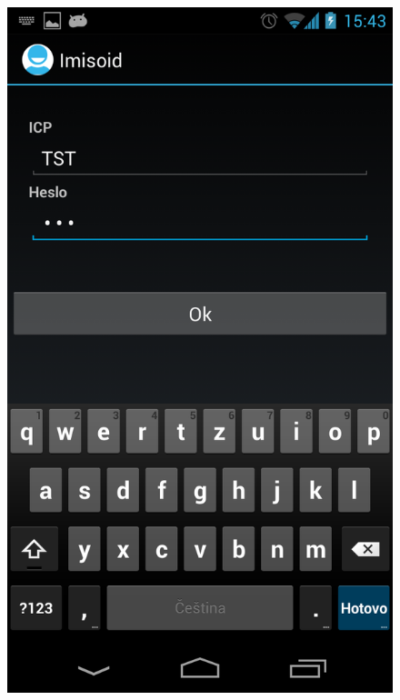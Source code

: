 \documentclass{diplomka}
\begin{document}
\begin{figure}[H]
\centering
\begin{minipage}{.45\textwidth}
  \centering
  \includegraphics[width=.75\linewidth]{scr/accact.png}
  \label{fig:accact}
\end{minipage}\hfill%
\begin{minipage}{.45\textwidth}
  \centering

\end{minipage}
\end{figure}
\end{document}
